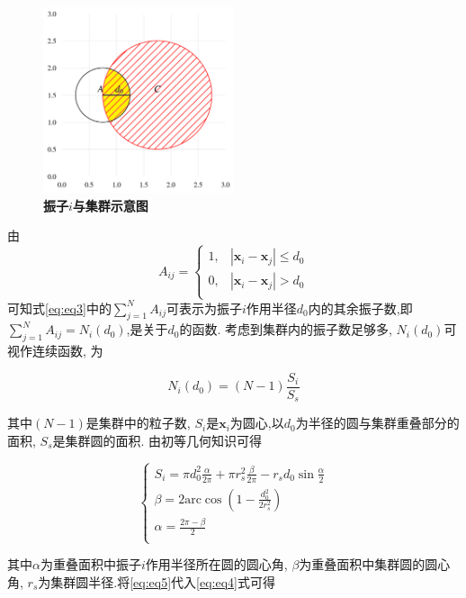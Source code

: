 \documentclass{article}
\begin{document}
\begin{figure}[H]
	\centering
	\includegraphics[width=0.5\textwidth]{./figs/circleSwarmEdges2.png}
	\caption{\small \textbf{振子$i$与集群示意图}}
	\label{fig:fig23.2}
\end{figure}

由
$$
A_{ij}=\begin{cases}
	1,&		\left| \mathbf{x}_i-\mathbf{x}_j \right|\leqslant d_0\\
	0,&		\left| \mathbf{x}_i-\mathbf{x}_j \right|>d_0\\
\end{cases}
$$
可知式\ref{eq:eq3}中的$\sum_{j=1}^N{A_{ij}}$可表示为振子$i$作用半径$d_0$内的其余振子数,即$\sum_{j=1}^N{A_{ij}}=N_i\left( d_0 \right)$,是关于$d_0$的函数. 考虑到集群内的振子数足够多, $N_i\left( d_0 \right)$可视作连续函数, 为

\begin{equation}\label{eq:eq4}
	N_i\left( d_0 \right) =\left( N-1 \right) \frac{S_i}{S_s}
\end{equation}

其中$(N-1)$是集群中的粒子数, $S_i$是$\mathbf{x}_i$为圆心,以$d_0$为半径的圆与集群重叠部分的面积, $S_s$是集群圆的面积. 由初等几何知识可得

\begin{equation}\label{eq:eq5}
	\begin{cases}
		S_i=\pi d_{0}^{2}\frac{\alpha}{2\pi}+\pi r_{s}^{2}\frac{\beta}{2\pi}-r_sd_0\sin \frac{\alpha}{2}\\
		\beta =2\mathrm{arc}\cos \left( 1-\frac{d_{0}^{2}}{2r_{s}^{2}} \right)\\
		\alpha =\frac{2\pi -\beta}{2}\\
	\end{cases}
\end{equation}

其中$\alpha$为重叠面积中振子$i$作用半径所在圆的圆心角, $\beta$为重叠面积中集群圆的圆心角, $r_s$为集群圆半径.将\ref{eq:eq5}代入\ref{eq:eq4}式可得
\end{document}
